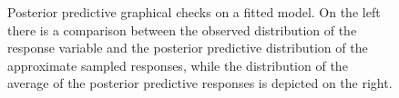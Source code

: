 \begin{figure}[ht]
  \centering
  \caption{Posterior predictive graphical checks on a fitted model. On the left there is a comparison between the observed distribution of the response variable and the posterior predictive distribution of the approximate sampled responses, while the distribution of the average of the posterior predictive responses is depicted on the right.}\label{fig:ppc}
\end{figure}
